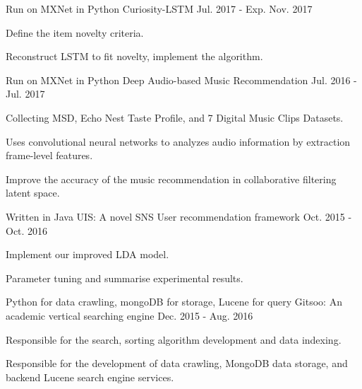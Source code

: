 \begin{cventries}
  \cventry
    {Run on MXNet in Python}
    {Curiosity-LSTM}
    {}
    {Jul. 2017 - Exp. Nov. 2017}
    {
      \begin{cvitems}
        \item {Define the item novelty criteria.}
        \item {Reconstruct LSTM to fit novelty, implement the algorithm.}
      \end{cvitems}
    }
  \cventry
    {Run on MXNet in Python}
    {Deep Audio-based Music Recommendation}
    {}
    {Jul. 2016 - Jul. 2017}
    {
      \begin{cvitems}
        \item {Collecting MSD, Echo Nest Taste Profile, and 7 Digital Music Clips Datasets.}
        \item {Uses convolutional neural networks to analyzes audio information by extraction frame-level features.}
        \item {Improve the accuracy of the music recommendation in collaborative filtering latent space.}
      \end{cvitems}
    }
  \cventry
    {Written in Java}
    {UIS: A novel SNS User recommendation framework}
    {}
    {Oct. 2015 - Oct. 2016}
    {
      \begin{cvitems}
        \item {Implement our improved LDA model.}
        \item {Parameter tuning and summarise experimental results.}
      \end{cvitems}
    }
  \cventry
    {Python for data crawling, mongoDB for storage, Lucene for query}
    {Gitsoo: An academic vertical searching engine}
    {}
    {Dec. 2015 - Aug. 2016}
    {
      \begin{cvitems}
        \item {Responsible for the search, sorting algorithm development and data indexing.}
        \item {Responsible for the development of data crawling, MongoDB data storage, and backend Lucene search engine services.}
      \end{cvitems}
    }
\end{cventries}